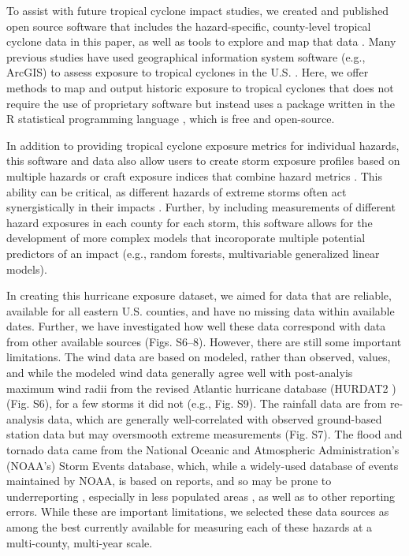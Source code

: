 \documentclass[fleqn,10pt,lineno]{olplainarticle}
\begin{document}
To assist with future tropical cyclone impact studies, we created and published
open source software that includes the hazard-specific, county-level tropical
cyclone data in this paper, as well as tools to explore and map that data
\citep{hurricaneexposure, hurricaneexposuredata}. Many previous studies have
used geographical information system software (e.g., ArcGIS) to assess exposure
to tropical cyclones in the U.S. \citep{grabich2016, zandbergen2009,
czajkowski2011, kruk2010}. Here, we offer methods to map and output historic
exposure to tropical cyclones that does not require the use of proprietary
software but instead uses a package written in the R statistical programming
language \citep{R}, which is free and open-source.

In addition to providing tropical cyclone exposure metrics for individual
hazards, this software and data also allow users to create storm exposure
profiles based on multiple hazards or craft exposure indices that combine hazard
metrics \citep{chakraborty2005population, peduzzi2009assessing}. This ability
can be critical, as different hazards of extreme storms often act
synergistically in their impacts \citep{smith2009}. Further, by including
measurements of different hazard exposures in each county for each storm, this
software allows for the development of more complex models that incoroporate
multiple potential predictors of an impact (e.g., random forests, multivariable
generalized linear models).

In creating this hurricane exposure dataset, we aimed for data that are
reliable, available for all eastern U.S. counties, and have no missing data
within available dates. Further, we have investigated how well these data
correspond with data from other available sources (Figs. S6--8). However, there
are still some important limitations. The wind data are based on modeled, rather
than observed, values, and while the modeled wind data generally agree well with
post-analyis maximum wind radii from the revised Atlantic hurricane database
(HURDAT2 \citep{landsea2013}) (Fig. S6), for a few storms it did not (e.g., Fig.
S9). The rainfall data are from re-analysis data, which are generally
well-correlated with observed ground-based station data but may oversmooth
extreme measurements (Fig. S7). The flood and tornado data came from the
National Oceanic and Atmospheric Administration's (NOAA's) Storm Events
database, which, while a widely-used database of events maintained by NOAA, is
based on reports, and so may be prone to underreporting \citep{Ashley2008flood,
Curran2000}, especially in less populated areas \citep{Witt1998, Ashley2007}, as
well as to other reporting errors. While these are important limitations, we
selected these data sources as among the best currently available for measuring
each of these hazards at a multi-county, multi-year scale.
\end{document}
